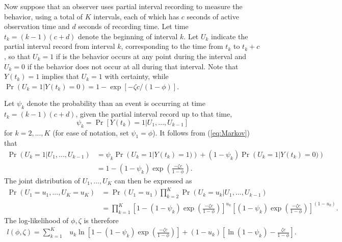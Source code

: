 \documentclass[man, noextraspace, floatsintext]{apa6}\usepackage[]{graphicx}\usepackage[]{color}
\begin{document}
Now suppose that an observer uses partial interval recording to measure the behavior, using a total of $K$ intervals, each of which has $c$ seconds of active observation time and $d$ seconds of recording time. Let time $t_k = (k-1)(c + d)$ denote the beginning of interval $k$. Let $U_k$ indicate the partial interval record from interval $k$, corresponding to the time from $t_k$ to $t_k + c$, so that $U_k = 1$ if is the behavior occurs at any point during the interval and $U_k = 0$ if the behavior does not occur at all during that interval. Note that $Y(t_k) = 1$ implies that $U_k = 1$ with certainty, while $\Pr\left(U_k = 1\left| Y(t_k) = 0\right.\right) = 1 - \exp\left[ -\zeta c / (1 - \phi)\right]$.

Let $\psi_k$ denote the probability than an event is occurring at time $t_k = (k-1)(c + d)$, given the partial interval record up to that time, 
\begin{equation}
\psi_k = \Pr\left[Y(t_k) = 1 \left| U_1,...,U_{k-1}\right.\right]
\end{equation}
for $k = 2,...,K$ (for ease of notation, set $\psi_1 = \phi$). It follows from (\ref{eq:Markov}) that 
\begin{align*}
\Pr\left(U_k = 1 \left| U_1,...,U_{k-1}\right.\right) &= \psi_k \Pr\left(U_k = 1 \left| Y(t_k) = 1)\right.\right)  + (1 - \psi_k)\Pr\left(U_k = 1 \left| Y(t_k) = 0)\right.\right) \\
&= 1 - (1 - \psi_k)\exp\left( \frac{-\zeta c}{1 - \phi}\right).
\end{align*}
The joint distribution of $U_1,...,U_K$ can then be expressed as 
\begin{align}
\Pr\left(U_1=u_1,...,U_K = u_K\right) &= \Pr\left(U_1=u_1\right) \prod_{k=2}^K \Pr\left(U_k=u_k \left| U_1,...,U_{k-1}\right.\right) \nonumber \\
&= \prod_{k=1}^K \left[1 - (1 - \psi_k)\exp\left( \frac{-\zeta c}{1 - \phi}\right) \right]^{u_k} \left[(1 - \psi_k)\exp\left( \frac{-\zeta c}{1 - \phi}\right)\right]^{(1 - u_k)}.
\end{align}
The log-likelihood of $\phi, \zeta$ is therefore 
\begin{align}
\label{eq:log_lik}
l\left(\phi,\zeta\right) = \sum_{k=1}^K & u_k \ln\left[1 - (1 - \psi_k)\exp\left( \frac{-\zeta c}{1 - \phi}\right)\right]  + (1 - u_k)\left[\ln\left(1 - \psi_k \right) - \frac{\zeta c}{1 - \phi}\right].
\end{align}
\end{document}
